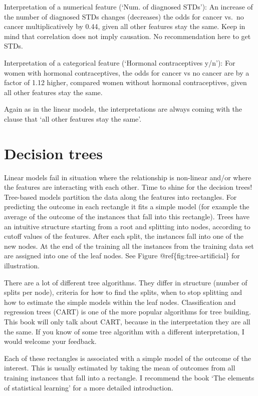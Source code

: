 \documentclass[12pt,]{krantz}
\theoremstyle{definition}
\theoremstyle{definition}
\theoremstyle{definition}
\theoremstyle{remark}
\begin{document}
Interpretation of a numerical feature (`Num. of diagnosed STDs'): An
increase of the number of diagnosed STDs changes (decreases) the odds
for cancer vs.~no cancer multiplicatively by 0.44, given all other
features stay the same. Keep in mind that correlation does not imply
causation. No recommendation here to get STDs.

Interpretation of a categorical feature (`Hormonal contraceptives y/n'):
For women with hormonal contraceptives, the odds for cancer vs no cancer
are by a factor of 1.12 higher, compared women without hormonal
contraceptives, given all other features stay the same.

Again as in the linear models, the interpretations are always coming
with the clause that `all other features stay the same'.

\section{Decision trees}\label{decision-trees}

Linear models fail in situation where the relationship is non-linear
and/or where the features are interacting with each other. Time to shine
for the decision trees! Tree-based models partition the data along the
features into rectangles. For predicting the outcome in each rectangle
it fits a simple model (for example the average of the outcome of the
instances that fall into this rectangle). Trees have an intuitive
structure starting from a root and splitting into nodes, according to
cutoff values of the features. After each split, the instances fall into
one of the new nodes. At the end of the training all the instances from
the training data set are assigned into one of the leaf nodes. See
Figure @ref\{fig:tree-artificial\} for illustration.

There are a lot of different tree algorithms. They differ in structure
(number of splits per node), criteria for how to find the splits, when
to stop splitting and how to estimate the simple models within the leaf
nodes. Classification and regression trees (CART) is one of the more
popular algorithms for tree building. This book will only talk about
CART, because in the interpretation they are all the same. If you know
of some tree algorithm with a different interpretation, I would welcome
your feedback.

Each of these rectangles is associated with a simple model of the
outcome of the interest. This is usually estimated by taking the mean of
outcomes from all training instances that fall into a rectangle. I
recommend the book `The elements of statistical learning'
\citep{Hastie2009} for a more detailed introduction.
\end{document}
